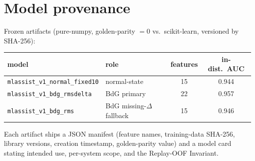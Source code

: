\documentclass[11pt]{article}
\newcommand{\code}[1]{\texttt{#1}}
\begin{document}
\section{Model provenance}
\label{app:prov}
Frozen artifacts (pure-numpy, golden-parity $=0$ vs.\ scikit-learn, versioned by SHA-256):
\begin{center}
\begin{tabular}{llcc}
\toprule
model & role & features & in-dist.\ AUC\footnotemark[4] \\
\midrule
\code{mlassist\_v1\_normal\_fixed10} & normal-state & 15 & 0.944 \\
\code{mlassist\_v1\_bdg\_rmsdelta}   & BdG primary  & 22 & 0.957 \\
\code{mlassist\_v1\_bdg\_rms}        & BdG missing-$\Delta$ fallback & 15 & 0.946 \\
\bottomrule
\end{tabular}
\end{center}
Each artifact ships a JSON manifest (feature names, training-data SHA-256, library versions, creation
timestamp, golden-parity value) and a model card stating intended use, per-system scope, and the
Replay-OOF Invariant.
\end{document}
